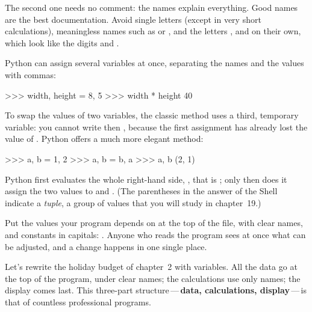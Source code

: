 The second one needs no comment: the names explain everything. Good names are the best
documentation. Avoid single letters (except in very short calculations), meaningless names such as
 or , and the letters ,  and  on their own, which look like the
digits  and .

Python can assign several variables at once, separating the names and the values with commas:

\begin{console}
>>> width, height = 8, 5
>>> width * height
40
\end{console}

To swap the values of two variables, the classic method uses a third, temporary variable: you cannot
write  then , because the first assignment has already lost the value of
. Python offers a much more elegant method:

\begin{console}
>>> a, b = 1, 2
>>> a, b = b, a
>>> a, b
(2, 1)
\end{console}

Python first evaluates the whole right-hand side, , that is ; only then does it
assign the two values to  and . (The parentheses in the answer of the Shell indicate a
\emph{tuple}, a group of values that you will study in chapter~19.)

\begin{pratique}
Put the values your program depends on at the top of the file, with clear names, and constants in
capitals: . Anyone who reads the program sees at once what can be adjusted, and
a change happens in one single place.
\end{pratique}


Let's rewrite the holiday budget of chapter~2 with variables. All the data go at the top of the
program, under clear names; the calculations use only names; the display comes last. This
three-part structure\,---\,\textbf{data, calculations, display}\,---\,is that of countless
professional programs.

